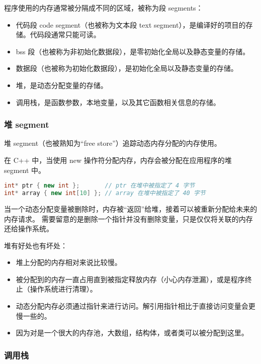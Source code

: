 \documentclass[../../LearnCpp.tex]{subfiles}
\begin{document}

程序使用的内存通常被分隔成不同的区域，被称为段 segments：

\begin{itemize}
  \item 代码段 code segment（也被称为文本段 text segment），是编译好的项目的存储。代码段通常只能可读。
  \item bss 段（也被称为非初始化数据段），是零初始化全局以及静态变量的存储。
  \item 数据段（也被称为初始化数据段），是初始化全局以及静态变量的存储。
  \item 堆，是动态分配变量的存储。
  \item 调用栈，是函数参数，本地变量，以及其它函数相关信息的存储。
\end{itemize}

\subsubsection*{堆 segment}

堆 segment（也被熟知为“free store”）追踪动态内存分配的内存使用。

在 C++ 中，当使用 new 操作符分配内存，内存会被分配在应用程序的堆 segment 中。

\begin{lstlisting}[language=C++]
int* ptr { new int };       // ptr 在堆中被指定了 4 字节
int* array { new int[10] }; // array 在堆中被指定了 40 字节
\end{lstlisting}

当一个动态分配变量被删除时，内存被“返回”给堆，接着可以被重新分配给未来的内存请求。
需要留意的是删除一个指针并没有删除变量，只是仅仅将关联的内存还给操作系统。

堆有好处也有坏处：

\begin{itemize}
  \item 堆上分配的内存相对来说比较慢。
  \item 被分配到的内存一直占用直到被指定释放内存（小心内存泄漏），或是程序终止（操作系统进行清理）。
  \item 动态分配内存必须通过指针来进行访问。解引用指针相比于直接访问变量会更慢一些的。
  \item 因为对是一个很大的内存池，大数组，结构体，或者类可以被分配到这里。
\end{itemize}

\subsubsection*{调用栈}
\end{document}
